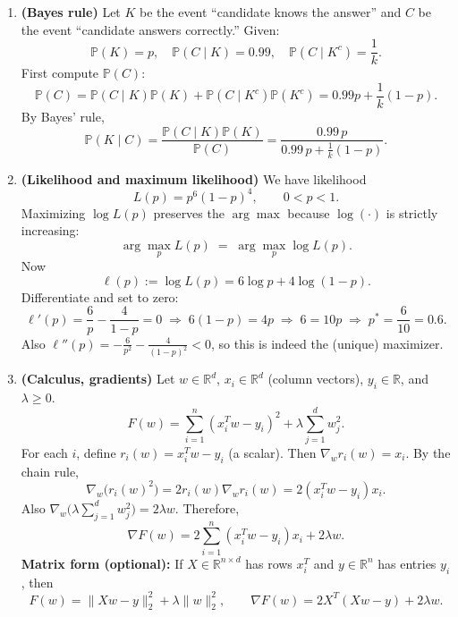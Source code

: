 \documentclass[en,hazy,blue,12pt,normal]{elegantnote}
\begin{document}
\begin{enumerate}[label=\textbf{(\alph*)}, leftmargin=2.2em]
Let the two tallest kids be $A$ and $B$.
\begin{itemize}
\item \emph{Same subgroup:} Either both in Group 1 or both in Group 2.
  \[
  \mathbb{P}(\text{both in Group 1})=\frac{\binom{2n-2}{n-2}}{\binom{2n}{n}}, \qquad
  \mathbb{P}(\text{both in Group 2})=\frac{\binom{2n-2}{n}}{\binom{2n}{n}}.
  \]
  Since $\binom{2n-2}{n}=\binom{2n-2}{n-2}$, we get
  \[
  \mathbb{P}(\text{same})=
  \frac{2\binom{2n-2}{n-2}}{\binom{2n}{n}}
  =\frac{n-1}{2n-1}.
  \]
\item \emph{Different subgroups:}
  \[
  \mathbb{P}(\text{different})=1-\mathbb{P}(\text{same})=1-\frac{n-1}{2n-1}=\frac{n}{2n-1}.
  \]
\end{itemize}
\emph{Check for $n=2$:} $\mathbb{P}(\text{same})=\frac{1}{3}$ and $\mathbb{P}(\text{different})=\frac{2}{3}$, which matches a manual enumeration for 4 kids.

\item \textbf{(Bayes rule)}
Let $K$ be the event ``candidate knows the answer'' and $C$ be the event ``candidate answers correctly.'' Given:
\[
\mathbb{P}(K)=p,\quad \mathbb{P}(C\mid K)=0.99,\quad \mathbb{P}(C\mid K^c)=\frac{1}{k}.
\]
First compute $\mathbb{P}(C)$:
\[
\mathbb{P}(C)=\mathbb{P}(C\mid K)\mathbb{P}(K)+\mathbb{P}(C\mid K^c)\mathbb{P}(K^c)
=0.99p+\frac{1}{k}(1-p).
\]
By Bayes' rule,
\[
\mathbb{P}(K\mid C)=\frac{\mathbb{P}(C\mid K)\mathbb{P}(K)}{\mathbb{P}(C)}
=\frac{0.99\,p}{0.99\,p+\frac{1}{k}(1-p)}.
\]

\item \textbf{(Likelihood and maximum likelihood)}
We have likelihood
\[
L(p)=p^6(1-p)^4,\qquad 0<p<1.
\]
Maximizing $\log L(p)$ preserves the $\arg\max$ because $\log(\cdot)$ is strictly increasing:
\[
\arg\max_p L(p) \;=\;\arg\max_p \log L(p).
\]
Now
\[
\ell(p):=\log L(p)=6\log p+4\log(1-p).
\]
Differentiate and set to zero:
\[
\ell'(p)=\frac{6}{p}-\frac{4}{1-p}=0
\;\Longrightarrow\;
6(1-p)=4p
\;\Longrightarrow\;
6=10p
\;\Longrightarrow\;
p^\ast=\frac{6}{10}=0.6.
\]
Also $\ell''(p)=-\frac{6}{p^2}-\frac{4}{(1-p)^2}<0$, so this is indeed the (unique) maximizer.

\item \textbf{(Calculus, gradients)}
Let $w\in\mathbb{R}^d$, $x_i\in\mathbb{R}^d$ (column vectors), $y_i\in\mathbb{R}$, and $\lambda\ge 0$.
\[
F(w)=\sum_{i=1}^n (x_i^T w-y_i)^2 + \lambda\sum_{j=1}^d w_j^2.
\]
For each $i$, define $r_i(w)=x_i^T w-y_i$ (a scalar). Then $\nabla_w r_i(w)=x_i$. By the chain rule,
\[
\nabla_w \big(r_i(w)^2\big)=2r_i(w)\nabla_w r_i(w)=2(x_i^T w-y_i)x_i.
\]
Also $\nabla_w\big(\lambda \sum_{j=1}^d w_j^2\big)=2\lambda w$. Therefore,
\[
\nabla F(w)=2\sum_{i=1}^n (x_i^T w-y_i)x_i + 2\lambda w.
\]
\textbf{Matrix form (optional):} If $X\in\mathbb{R}^{n\times d}$ has rows $x_i^T$ and $y\in\mathbb{R}^n$ has entries $y_i$, then
\[
F(w)=\|Xw-y\|_2^2+\lambda\|w\|_2^2,
\qquad
\nabla F(w)=2X^T(Xw-y)+2\lambda w.
\]


\end{enumerate}
\end{document}
